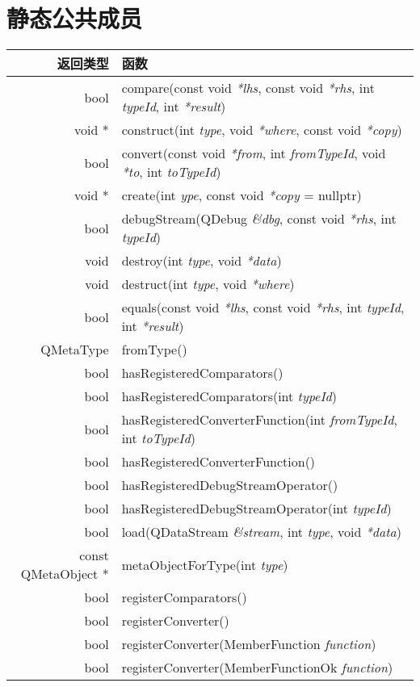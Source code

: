 \section{静态公共成员}

\begin{longtable}{|r|m{28em}|}   
\hline
返回类型 	& 函数 \\
\hline
bool	& compare(const void \emph{*lhs}, const void \emph{*rhs}, int \emph{typeId}, int \emph{*result})\\
\hline
void *	&construct(int \emph{type}, void \emph{*where}, const void \emph{*copy})\\
\hline
bool	& convert(const void \emph{*from}, int \emph{fromTypeId}, void \emph{*to}, int \emph{toTypeId})\\
\hline
void *	& create(int \emph{ype}, const void \emph{*copy} = nullptr)\\
\hline
bool	& debugStream(QDebug \emph{\&dbg}, const void \emph{*rhs}, int \emph{typeId})\\
\hline
void	& destroy(int \emph{type}, void \emph{*data})\\
\hline
void	& destruct(int \emph{type}, void \emph{*where})\\
\hline
bool	&equals(const void \emph{*lhs}, const void \emph{*rhs}, int \emph{typeId}, int \emph{*result})\\
\hline
QMetaType&	fromType()\\
\hline
bool	& hasRegisteredComparators()\\
\hline
bool	& hasRegisteredComparators(int \emph{typeId})\\
\hline
bool	&hasRegisteredConverterFunction(int \emph{fromTypeId}, int \emph{toTypeId})\\
\hline
bool	&hasRegisteredConverterFunction()\\
\hline
bool	&hasRegisteredDebugStreamOperator()\\
\hline
bool	&hasRegisteredDebugStreamOperator(int \emph{typeId})\\
\hline
bool	&load(QDataStream  \emph{\&stream}, int  \emph{type}, void \emph{*data})\\
\hline
const QMetaObject *&	metaObjectForType(int \emph{type})\\
\hline
bool&	registerComparators()\\
\hline
bool&	registerConverter()\\
\hline
bool&	registerConverter(MemberFunction \emph{function})\\
\hline
bool&	registerConverter(MemberFunctionOk \emph{function})\\

\end{longtable}

